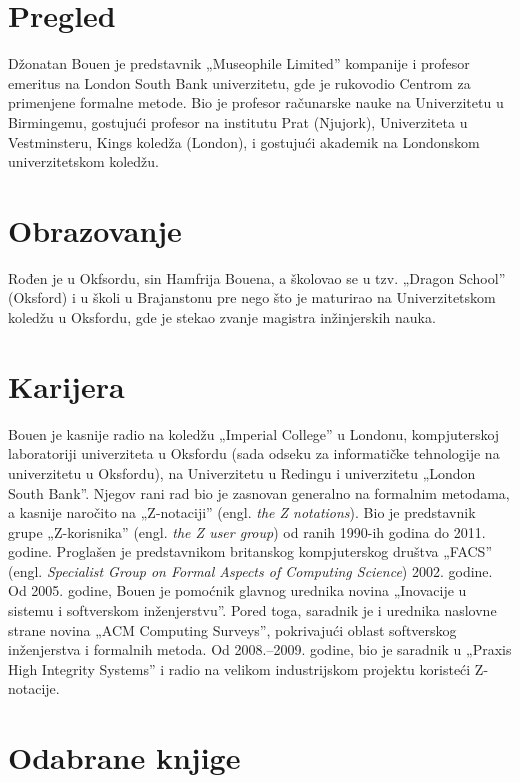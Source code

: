 \documentclass[a4paper]{article}
\begin{document}
\newpage
\section{Pregled}
\label{sec:pregled}
Džonatan Bouen je predstavnik „Museophile Limited” kompanije i profesor emeritus na London South Bank univerzitetu, gde je rukovodio Centrom za primenjene formalne metode. Bio je profesor računarske nauke na Univerzitetu u Birmingemu, gostujući profesor na institutu Prat (Njujork), Univerziteta u Vestminsteru, Kings koledža (London), i gostujući akademik na Londonskom univerzitetskom koledžu.

\section{Obrazovanje}
Rođen je u Okfsordu, sin Hamfrija Bouena, a školovao se u tzv. „Dragon School” (Oksford) i u školi u Brajanstonu pre nego što je maturirao na Univerzitetskom koledžu u Oksfordu, gde je stekao zvanje magistra inžinjerskih nauka. 
\section{Karijera}
Bouen je kasnije radio na koledžu „Imperial College” u Londonu, kompjuterskoj laboratoriji univerziteta u Oksfordu (sada odseku za informatičke tehnologije na univerzitetu u Oksfordu), na Univerzitetu u Redingu i univerzitetu „London South Bank”. Njegov rani rad bio je zasnovan generalno na formalnim metodama, a kasnije naročito na „Z-notaciji” (engl. \textit{the Z notations}). Bio je predstavnik grupe „Z-korisnika” (engl. \textit{the Z user group}) od ranih 1990-ih godina do 2011. godine. Proglašen je predstavnikom britanskog kompjuterskog društva „FACS” (engl. \textit{Specialist Group on Formal Aspects of Computing Science}) 2002. godine. Od 2005. godine, Bouen je pomoćnik glavnog urednika novina „Inovacije u sistemu i softverskom inženjerstvu”. Pored toga, saradnik je i urednika naslovne strane novina „ACM Computing Surveys”, pokrivajući oblast softverskog inženjerstva i formalnih metoda. Od 2008.–2009. godine, bio je saradnik u „Praxis High Integrity Systems” i radio na velikom industrijskom projektu koristeći Z-notacije. 
\section{Odabrane knjige}
\end{document}
